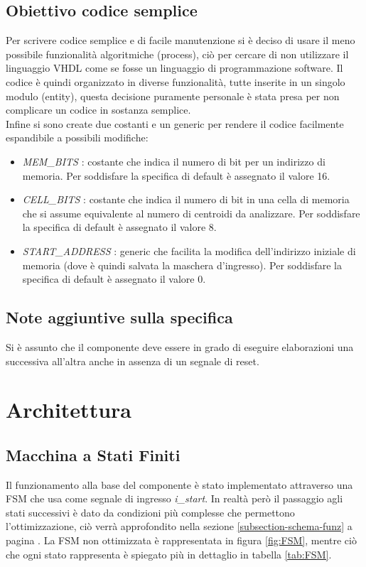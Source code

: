\documentclass{article}
\begin{document}
\subsection{Obiettivo codice semplice}
Per scrivere codice semplice e di facile manutenzione si è deciso di usare il meno possibile funzionalità algoritmiche (process), ciò per cercare di non utilizzare il linguaggio VHDL come se fosse un linguaggio di programmazione software. Il codice è quindi organizzato in diverse funzionalità, tutte inserite in un singolo modulo (entity), questa decisione puramente personale è stata presa per non complicare un codice in sostanza semplice.\\
Infine si sono create due costanti e un generic per rendere il codice facilmente espandibile a possibili modifiche:
\begin{itemize}
    \item \textit{MEM\_BITS} : costante che indica il numero di bit per un indirizzo di memoria. Per soddisfare la specifica di default è assegnato il valore 16.
    \item \textit{CELL\_BITS} : costante che indica il numero di bit in una cella di memoria che si assume equivalente al numero di centroidi da analizzare. Per soddisfare la specifica di default è assegnato il valore 8.
    \item \textit{START\_ADDRESS} : generic che facilita la modifica dell'indirizzo iniziale di memoria (dove è quindi salvata la maschera d'ingresso). Per soddisfare la specifica di default è assegnato il valore 0.
\end{itemize}

\subsection{Note aggiuntive sulla specifica}
Si è assunto che il componente deve essere in grado di eseguire elaborazioni una successiva all'altra anche in assenza di un segnale di reset.


\pagebreak
\section{Architettura}

\subsection{Macchina a Stati Finiti}
Il funzionamento alla base del componente è stato implementato attraverso una FSM che usa come segnale di ingresso \textit{i\_start}. In realtà però il passaggio agli stati successivi è dato da condizioni più complesse che permettono l'ottimizzazione, ciò verrà approfondito nella sezione \ref{subsection-schema-funz} a pagina \pageref{subsection-schema-funz}.
La FSM non ottimizzata è rappresentata in figura \ref{fig:FSM}, mentre ciò che ogni stato rappresenta è spiegato più in dettaglio in tabella \ref{tab:FSM}.
\end{document}
